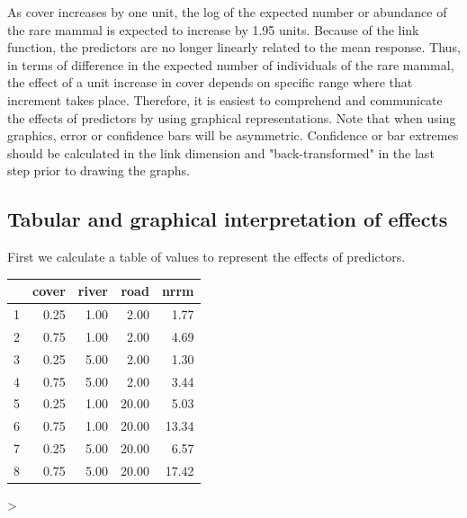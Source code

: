 \documentclass{article}
\begin{document}
As cover increases by one unit, the log of the expected number or abundance of the rare mammal is expected to increase by 1.95 units. Because of the link function, the predictors are no longer linearly related to the mean response. Thus, in terms of difference in the expected number of individuals of the rare mammal, the effect of a unit increase in cover depends on specific range where that increment takes place. Therefore, it is easiest to comprehend and communicate the effects of predictors by using graphical representations. Note that when using graphics, error or confidence bars will be asymmetric. Confidence or bar extremes should be calculated in the link dimension and "back-transformed" in the last step prior to drawing the graphs.

\subsection{Tabular and graphical interpretation of effects}

First we calculate a table of values to represent the effects of predictors.

\begin{Schunk}
\begin{table}[ht]
\centering
\begin{tabular}{rrrrr}
  \hline
 & cover & river & road & nrrm \\ 
  \hline
1 & 0.25 & 1.00 & 2.00 & 1.77 \\ 
  2 & 0.75 & 1.00 & 2.00 & 4.69 \\ 
  3 & 0.25 & 5.00 & 2.00 & 1.30 \\ 
  4 & 0.75 & 5.00 & 2.00 & 3.44 \\ 
  5 & 0.25 & 1.00 & 20.00 & 5.03 \\ 
  6 & 0.75 & 1.00 & 20.00 & 13.34 \\ 
  7 & 0.25 & 5.00 & 20.00 & 6.57 \\ 
  8 & 0.75 & 5.00 & 20.00 & 17.42 \\ 
   \hline
\end{tabular}
\end{table}\begin{Sinput}
> 
\end{Sinput}
\end{Schunk}
\end{document}
